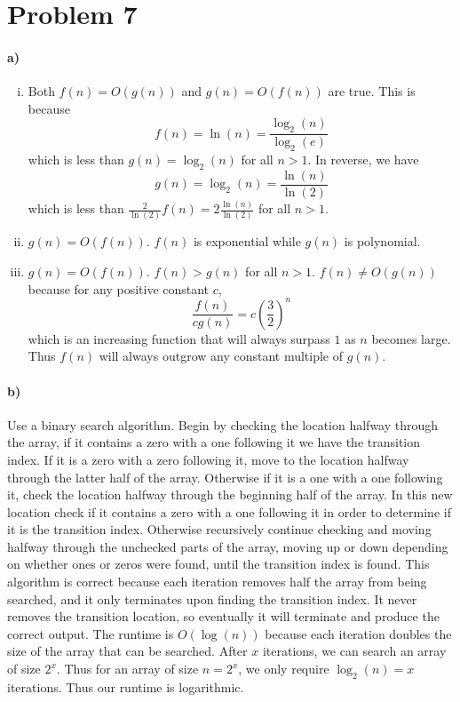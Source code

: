 \documentclass[12pt]{article}
\begin{document}
\section*{Problem 7}

\paragraph{a)}

\begin{enumerate}[i)]
        \item Both \(f(n)=O(g(n))\) and \(g(n)=O(f(n))\) are true. This is because
                \[f(n)=\ln(n)=\frac{\log_2(n)}{\log_2(e)}\]
                which is less than \(g(n)=\log_2(n)\) for all \(n>1\). In reverse, we have
                \[g(n)=\log_2(n)=\frac{\ln(n)}{\ln(2)}\]
                which is less than \(\frac{2}{\ln(2)}f(n)=2\frac{\ln(n)}{\ln(2)}\) for all \(n>1\).
        \item \(g(n)=O(f(n))\). \(f(n)\) is exponential while \(g(n)\) is polynomial.
        \item \(g(n)=O(f(n))\). \(f(n)>g(n)\) for all \(n>1\). \(f(n)\neq O(g(n))\) because for any positive constant \(c\),
                \[\frac{f(n)}{cg(n)}=c\left(\frac{3}{2}\right)^n\]
                which is an increasing function that will always surpass \(1\) as \(n\) becomes large. Thus \(f(n)\) will always
                outgrow any constant multiple of \(g(n)\).
\end{enumerate}

\paragraph{b)}

Use a binary search algorithm. Begin by checking the location halfway through the array, if it contains a zero with a one following it
we have the transition index. If it is a zero with a zero following it, move to the location halfway through the latter half of the array.
Otherwise if it is a one with a one following it, check the location halfway through the beginning half of the array. In this new location check
if it contains a zero with a one following it in order to determine if it is the transition index. Otherwise recursively continue checking and moving halfway
through the unchecked parts of the array, moving up or down depending on whether ones or zeros were found, until the transition index is found. This algorithm
is correct because each iteration removes half the array from being searched, and it only terminates upon finding the transition index. It never removes the transition
location, so eventually it will terminate and produce the correct output. The runtime is \(O(\log(n))\) because each iteration doubles the size of the array that can be searched.
After \(x\) iterations, we can search an array of size \(2^x\). Thus for an array of size \(n=2^x\), we only require \(\log_2(n)=x\) iterations. Thus our runtime is logarithmic.
\end{document}
